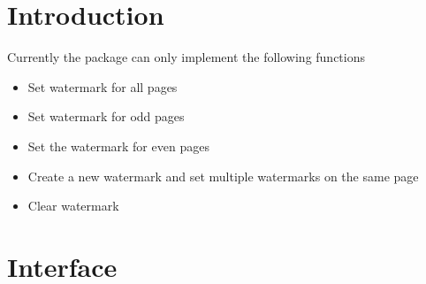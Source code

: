 \documentclass{l3doc}
\title{\pkg{magicwatermark}}
\author{lijun guo \\ liguo1020@gmail.com}
\date{\today\quad\version}
\begin{document}
\maketitle
\tableofcontents
\begin{abstract}
 is a package based on  and  and encapsulated by \LaTeX3 \. It can flexibly set and clear watermarks. All watermark content is placed in \ inside a \verb|node| of \verb|tikz| and in the center of the page.
\end{abstract}
\section{Introduction}
Currently the   package can only implement the following functions
\begin{itemize}
 \item Set watermark for all pages
 \item Set watermark for odd pages
 \item Set the watermark for even pages
 \item Create a new watermark and set multiple watermarks on the same page
 \item Clear watermark
\end{itemize}
\section{Interface}
\end{document}
